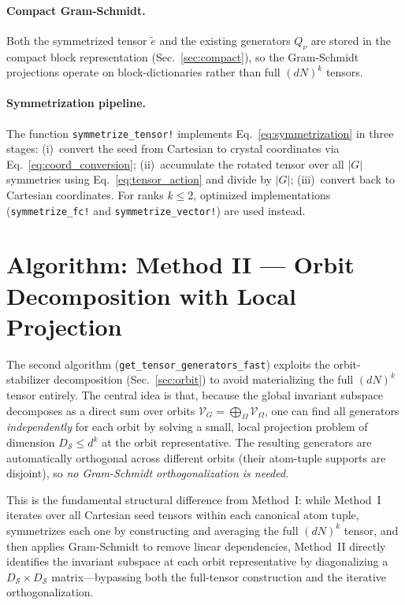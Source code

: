 \documentclass[twocolumn,amsmath,amssymb,aps,prb,10pt,floatfix]{revtex4-2}
\begin{document}
\paragraph{Compact Gram-Schmidt.}
Both the symmetrized tensor $\tilde{e}$ and the existing generators $Q_\nu$ are stored in the compact block representation (Sec.~\ref{sec:compact}), so the Gram-Schmidt projections operate on block-dictionaries rather than full $(dN)^k$ tensors.

\paragraph{Symmetrization pipeline.}
The function \texttt{symmetrize\_tensor!} implements Eq.~\eqref{eq:symmetrization} in three stages:
(i)~convert the seed from Cartesian to crystal coordinates via Eq.~\eqref{eq:coord_conversion};
(ii)~accumulate the rotated tensor over all $|G|$ symmetries using Eq.~\eqref{eq:tensor_action} and divide by $|G|$;
(iii)~convert back to Cartesian coordinates.
For ranks $k \leq 2$, optimized implementations (\texttt{symmetrize\_fc!} and \texttt{symmetrize\_vector!}) are used instead.


\section{Algorithm: Method II --- Orbit Decomposition with Local Projection}
\label{sec:method2}

The second algorithm (\texttt{get\_tensor\_generators\_fast}) exploits the orbit-stabilizer decomposition (Sec.~\ref{sec:orbit}) to avoid materializing the full $(dN)^k$ tensor entirely.
The central idea is that, because the global invariant subspace decomposes as a direct sum over orbits $\mathcal{V}_G = \bigoplus_\Omega \mathcal{V}_\Omega$, one can find all generators \emph{independently} for each orbit by solving a small, local projection problem of dimension $D_{\mathcal{S}} \leq d^k$ at the orbit representative.
The resulting generators are automatically orthogonal across different orbits (their atom-tuple supports are disjoint), so \emph{no Gram-Schmidt orthogonalization is needed}.

This is the fundamental structural difference from Method~I: while Method~I iterates over all Cartesian seed tensors within each canonical atom tuple, symmetrizes each one by constructing and averaging the full $(dN)^k$ tensor, and then applies Gram-Schmidt to remove linear dependencies, Method~II directly identifies the invariant subspace at each orbit representative by diagonalizing a $D_{\mathcal{S}} \times D_{\mathcal{S}}$ matrix---bypassing both the full-tensor construction and the iterative orthogonalization.
\end{document}
